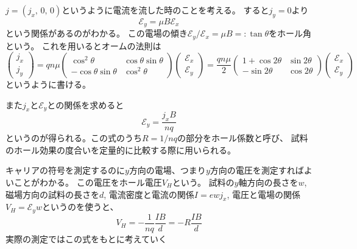 \documentclass[11pt,dvipdfmx,a4paper]{jsarticle}
\numberwithin{equation}{section}
\begin{document}
\(j=(j_x,\,0,\,0)\)というように電流を流した時のことを考える。
すると\(j_y=0\)より
\begin{equation}
	\mathscr{E}_y = \mu B \mathscr{E}_x
\end{equation}
という関係があるのがわかる。
この電場の傾き\(\mathscr{E}_y/\mathscr{E}_x=\mu B =:\tan\theta\)をホール角という。
これを用いるとオームの法則は
\begin{equation}
	\begin{pmatrix}
		j_x \\ j_y
	\end{pmatrix}
	= qn\mu
	\begin{pmatrix}
		\cos^2\theta & \cos\theta\sin\theta\\
		-\cos\theta\sin\theta & \cos^2\theta
	\end{pmatrix}
	\begin{pmatrix}
		\mathscr{E}_x \\ \mathscr{E}_y
	\end{pmatrix}
	= \frac{qn\mu}{2}
	\begin{pmatrix}
		1+\cos 2\theta & \sin 2\theta\\
		-\sin 2\theta & \cos 2\theta
	\end{pmatrix}
	\begin{pmatrix}
		\mathscr{E}_x \\ \mathscr{E}_y
	\end{pmatrix}
\end{equation}
というように書ける。

また\(j_x\)と\(\mathscr{E}_y\)との関係を求めると
\begin{equation}
	\mathscr{E}_y = \frac{j_x B}{nq}
\end{equation}
というのが得られる。この式のうち\(R=1/nq\)の部分をホール係数と呼び、
試料のホール効果の度合いを定量的に比較する際に用いられる。

キャリアの符号を測定するのに\(y\)方向の電場、つまり\(y\)方向の電圧を測定すればよいことがわかる。
この電圧をホール電圧\(V_H\)という。
試料の\(y\)軸方向の長さを\(w\),
磁場方向の試料の長さを\(d\),
電流密度と電流の関係\(I=ewj_x\),
電圧と電場の関係\(V_H = \mathscr{E}_y w\)というのを使うと、
\begin{equation}
	V_H = -\frac{1}{nq} \frac{IB}{d} = -R\frac{IB}{d} \label{eq:2-15}
\end{equation}
実際の測定ではこの式をもとに考えていく
\end{document}
